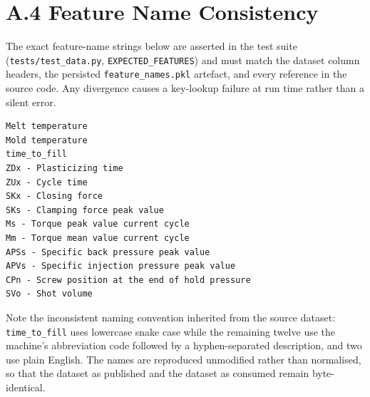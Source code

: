 \hypertarget{a.4-feature-name-consistency}{%
\section{A.4 Feature Name Consistency}\label{a.4-feature-name-consistency}}

The exact feature-name strings below are asserted in the test suite (\texttt{tests/test\_data.py}, \texttt{EXPECTED\_FEATURES}) and must match the dataset column headers, the persisted \texttt{feature\_names.pkl} artefact, and every reference in the source code. Any divergence causes a key-lookup failure at run time rather than a silent error.

\begin{verbatim}
Melt temperature
Mold temperature
time_to_fill
ZDx - Plasticizing time
ZUx - Cycle time
SKx - Closing force
SKs - Clamping force peak value
Ms - Torque peak value current cycle
Mm - Torque mean value current cycle
APSs - Specific back pressure peak value
APVs - Specific injection pressure peak value
CPn - Screw position at the end of hold pressure
SVo - Shot volume
\end{verbatim}

Note the inconsistent naming convention inherited from the source dataset: \texttt{time\_to\_fill} uses lowercase snake case while the remaining twelve use the machine's abbreviation code followed by a hyphen-separated description, and two use plain English. The names are reproduced unmodified rather than normalised, so that the dataset as published and the dataset as consumed remain byte-identical.
